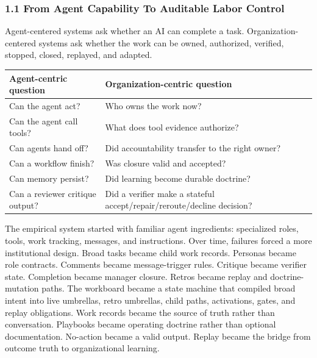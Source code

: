 \documentclass[
]{article}
\newcounter{none} %
\begin{document}
\subsubsection{1.1 From Agent Capability To Auditable Labor Control}\label{from-agent-capability-to-auditable-labor-control}

Agent-centered systems ask whether an AI can complete a task. Organization-centered systems ask whether the work can be owned, authorized, verified, stopped, closed, replayed, and adapted.

{\def\LTcaptype{none} %
\begin{longtable}[]{@{}
  >{\raggedright\arraybackslash}p{}
  >{\raggedright\arraybackslash}p{}@{}}
\toprule\noalign{}
\begin{minipage}[b]{\linewidth}\raggedright
Agent-centric question
\end{minipage} & \begin{minipage}[b]{\linewidth}\raggedright
Organization-centric question
\end{minipage} \\
\midrule\noalign{}
\endhead
\bottomrule\noalign{}
\endlastfoot
Can the agent act? & Who owns the work now? \\
Can the agent call tools? & What does tool evidence authorize? \\
Can agents hand off? & Did accountability transfer to the right owner? \\
Can a workflow finish? & Was closure valid and accepted? \\
Can memory persist? & Did learning become durable doctrine? \\
Can a reviewer critique output? & Did a verifier make a stateful accept/repair/reroute/decline decision? \\
\end{longtable}
}

The empirical system started with familiar agent ingredients: specialized roles, tools, work tracking, messages, and instructions. Over time, failures forced a more institutional design. Broad tasks became child work records. Personas became role contracts. Comments became message-trigger rules. Critique became verifier state. Completion became manager closure. Retros became replay and doctrine-mutation paths. The workboard became a state machine that compiled broad intent into live umbrellas, retro umbrellas, child paths, activations, gates, and replay obligations. Work records became the source of truth rather than conversation. Playbooks became operating doctrine rather than optional documentation. No-action became a valid output. Replay became the bridge from outcome truth to organizational learning.
\end{document}
